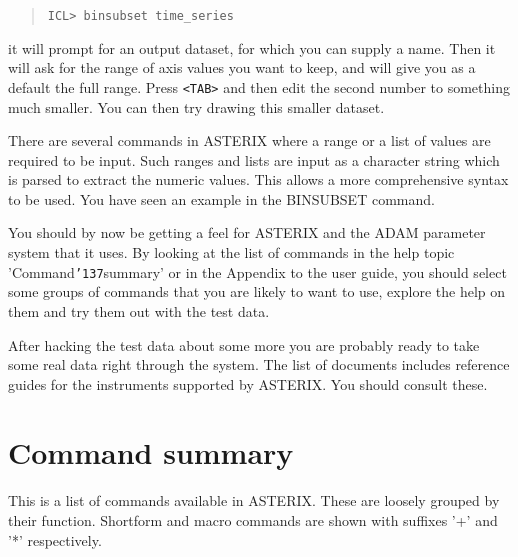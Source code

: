 \documentclass{book}
\renewcommand{\_}{{\tt\char'137}}     %
\begin{document}
\begin{quote}\begin{verbatim}
ICL> binsubset time_series
\end{verbatim}\end{quote}
it will prompt for an output dataset, for which you can supply a name.
Then it will ask for the range of axis values you want to keep, and
will give you as a default the full range. Press \verb+<TAB>+ and then edit
the second number to something much smaller. You can then try drawing
this smaller dataset.

There are several commands in ASTERIX where a range or a list of
values are required to be input. Such ranges and lists are input as a
character string which is parsed to extract the numeric values. This
allows a more comprehensive syntax to be used. You have seen an example
in the BINSUBSET command.

You should by now be getting a feel for ASTERIX and the ADAM parameter
system that it uses. By looking at the list of commands in the help
topic 'Command\_summary' or in the Appendix to the user guide, you should
select some groups of commands that you are likely to want to use, explore
the help on them and try them out with the test data.

After hacking the test data about some more you are probably ready to
take some real data right through the system. The list of documents
includes reference guides for the instruments supported by
ASTERIX. You should consult these.

\chapter{Command summary}
This is a list of commands available in ASTERIX. These are loosely
grouped by their function. Shortform and macro commands are shown
with suffixes '+' and '*' respectively.
\end{document}
